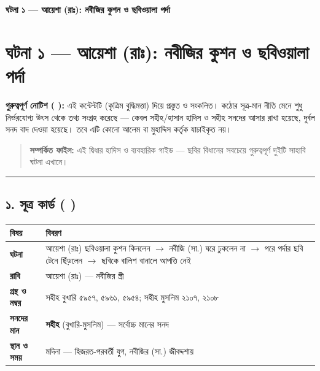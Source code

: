 

\begin{center}{\Large\bfseries\color{emerald} ঘটনা ১ — আয়েশা (রাঃ): নবীজির কুশন ও ছবিওয়ালা পর্দা}\end{center}
\vspace{1em}
\section*{ঘটনা ১ — আয়েশা (রাঃ): নবীজির কুশন ও ছবিওয়ালা পর্দা}

\begin{warnbox}
 \textbf{গুরুত্বপূর্ণ নোটিশ ( ):} এই কন্টেন্টটি  (কৃত্রিম বুদ্ধিমত্তা) দিয়ে প্রস্তুত ও সংকলিত।  কঠোর সূত্র-মান নীতি মেনে শুধু নির্ভরযোগ্য উৎস থেকে তথ্য সংগ্রহ করেছে — কেবল সহীহ/হাসান হাদিস ও সহীহ সনদের আসার রাখা হয়েছে, দুর্বল সনদ বাদ দেওয়া হয়েছে। তবে এটি কোনো আলেম বা মুহাদ্দিস কর্তৃক যাচাইকৃত নয়।
\end{warnbox}

\begin{quote}
\textbf{সম্পর্কিত ফাইল:} এই দ্বিধার হাদিস ও ব্যবহারিক গাইড — ছবির বিধানের সবচেয়ে গুরুত্বপূর্ণ দুইটি সাহাবি ঘটনা এখানে।
\end{quote}

\medskip\hrule\medskip

\subsection*{১. সূত্র কার্ড ( )}

\begin{table}[h]\centering\small
\begin{tabular}{ll}
বিষয় & বিবরণ \\
\hline
\textbf{ঘটনা} & আয়েশা (রাঃ) ছবিওয়ালা কুশন কিনলেন $\rightarrow$ নবীজি (সা.) ঘরে ঢুকলেন না $\rightarrow$ পরে পর্দার ছবি টেনে ছিঁড়লেন $\rightarrow$ ছবিকে বালিশ বানালে আপত্তি নেই \\
\textbf{রাবি} & আয়েশা (রাঃ) — নবীজির স্ত্রী \\
\textbf{গ্রন্থ ও নম্বর} & সহীহ বুখারি ৫৯৫৭, ৫৯৬১, ৫৯৫৪; সহীহ মুসলিম ২১০৭, ২১০৮ \\
\textbf{সনদের মান} & \textbf{সহীহ} (বুখারি-মুসলিম) — সর্বোচ্চ মানের সনদ \\
\textbf{স্থান ও সময়} & মদিনা — হিজরত-পরবর্তী যুগ, নবীজির (সা.) জীবদ্দশায় \\
\hline
\end{tabular}
\end{table}


